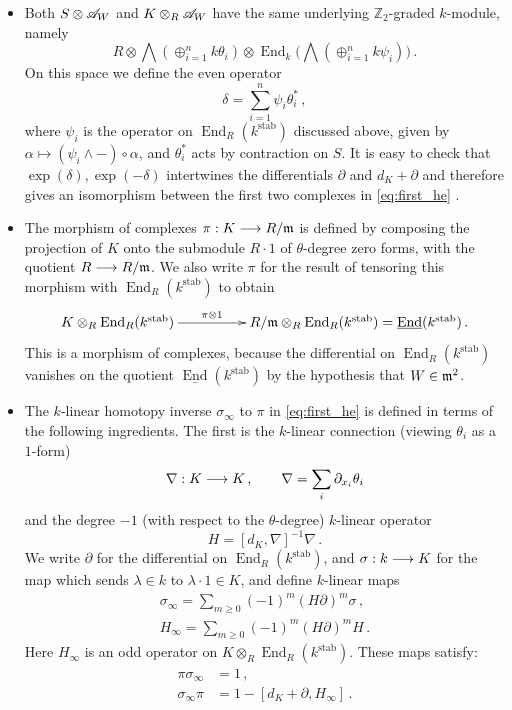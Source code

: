 \documentclass[english,letter paper,12pt,leqno]{article}
\theoremstyle{example}
\numberwithin{equation}{section}
\def\stab{\operatorname{stab}}
\def\be{\begin{equation}}
\def\ee{\end{equation}}
\def\nZ{\mathds{Z}}
\DeclareMathOperator{\End}{End}
\begin{document}
\begin{itemize}
\item Both $S \otimes \mathscr{A}_W$ and $K \otimes_R \mathscr{A}_W$ have the same underlying $\nZ_2$-graded $k$-module, namely
\be\label{eq:same_underlying}
R \otimes \bigwedge( \oplus_{i=1}^n k\theta_i ) \otimes \End_k\big( \bigwedge( \oplus_{i=1}^n k \psi_i ) \big)\,.
\ee
On this space we define the even operator
\be
\delta = \sum_{i=1}^n \psi_i \theta_i^*\,,
\ee
where $\psi_i$ is the operator on $\End_R(k^{\stab})$ discussed above, given by $\alpha \mapsto (\psi_i \wedge -) \circ \alpha$, and $\theta_i^*$ acts by contraction on $S$. It is easy to check that $\exp(\delta),\exp(-\delta)$ intertwines the differentials $\partial$ and $d_K + \partial$ and therefore gives an isomorphism between the first two complexes in \eqref{eq:first_he} \cite[Proposition 4.11]{murfet}.
\item The morphism of complexes $\pi: K \longrightarrow R/\mathfrak{m}$ is defined by composing the projection of $K$ onto the submodule $R \cdot 1$ of $\theta$-degree zero forms, with the quotient $R \longrightarrow R/\mathfrak{m}$. We also write $\pi$ for the result of tensoring this morphism with $\End_R(k^{\stab})$ to obtain
\[
\xymatrix@C+2pc{
K \otimes_R \End_R(k^{\stab}) \ar[r]^-{\pi \otimes 1} & R/\mf{m} \otimes_R \End_R(k^{\stab}) = \underline{\End}(k^{\stab})\,.
}
\]
This is a morphism of complexes, because the differential on $\End_R(k^{\stab})$ vanishes on the quotient $\underline{\End}(k^{\stab})$ by the hypothesis that $W \in \mathfrak{m}^2$.
\item The $k$-linear homotopy inverse $\sigma_\infty$ to $\pi$ in \eqref{eq:first_he} is defined in terms of the following ingredients. The first is the $k$-linear connection (viewing $\theta_i$ as a $1$-form)
\be
\nabla: K \lto K\,, \qquad \nabla = \sum_i \partial_{x_i} \theta_i
\ee
and the degree $-1$ (with respect to the $\theta$-degree) $k$-linear operator
\be
H = [d_K, \nabla]^{-1} \nabla\,.
\ee
We write $\partial$ for the differential on $\End_R(k^{\stab})$, and $\sigma: k \longrightarrow K$ for the map which sends $\lambda \in k$ to $\lambda \cdot 1 \in K$, and define $k$-linear maps
\begin{align}
\sigma_\infty = \sum_{m \ge 0} (-1)^m (H \partial)^m \sigma\,,\\
H_\infty = \sum_{m \ge 0} (-1)^m (H \partial)^m H\,.
\end{align}
Here $H_\infty$ is an odd operator on $K \otimes_R \End_R(k^{\stab})$. These maps satisfy:
\begin{align}
\pi \sigma_\infty &= 1\,,\\
 \sigma_\infty \pi &= 1 - [d_K + \partial, H_\infty]\,.
\end{align}
\end{itemize}
\end{document}
